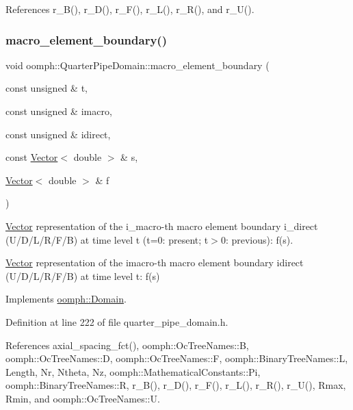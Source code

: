 References r\+\_\+\+B(), r\+\_\+\+D(), r\+\_\+\+F(), r\+\_\+\+L(), r\+\_\+\+R(), and r\+\_\+\+U().

\mbox{\label{classoomph_1_1QuarterPipeDomain_ae8cc6433c58dcfb265335744ed8a330a}} 
\subsubsection{\texorpdfstring{macro\+\_\+element\+\_\+boundary()}{macro\_element\_boundary()}}
{\footnotesize\ttfamily void oomph\+::\+Quarter\+Pipe\+Domain\+::macro\+\_\+element\+\_\+boundary (\begin{DoxyParamCaption}\item[{const unsigned \&}]{t,  }\item[{const unsigned \&}]{imacro,  }\item[{const unsigned \&}]{idirect,  }\item[{const \hyperlink{classoomph_1_1Vector}{Vector}$<$ double $>$ \&}]{s,  }\item[{\hyperlink{classoomph_1_1Vector}{Vector}$<$ double $>$ \&}]{f }\end{DoxyParamCaption})\hspace{0.3cm}{\ttfamily [virtual]}}



\hyperlink{classoomph_1_1Vector}{Vector} representation of the i\+\_\+macro-\/th macro element boundary i\+\_\+direct (U/\+D/\+L/\+R/\+F/B) at time level t (t=0\+: present; t$>$0\+: previous)\+: f(s). 

\hyperlink{classoomph_1_1Vector}{Vector} representation of the imacro-\/th macro element boundary idirect (U/\+D/\+L/\+R/\+F/B) at time level t\+: f(s) 

Implements \hyperlink{classoomph_1_1Domain_a95f3e00d28ea37e6c4d3027bfac91096}{oomph\+::\+Domain}.



Definition at line 222 of file quarter\+\_\+pipe\+\_\+domain.\+h.



References axial\+\_\+spacing\+\_\+fct(), oomph\+::\+Oc\+Tree\+Names\+::B, oomph\+::\+Oc\+Tree\+Names\+::D, oomph\+::\+Oc\+Tree\+Names\+::F, oomph\+::\+Binary\+Tree\+Names\+::L, Length, Nr, Ntheta, Nz, oomph\+::\+Mathematical\+Constants\+::\+Pi, oomph\+::\+Binary\+Tree\+Names\+::R, r\+\_\+\+B(), r\+\_\+\+D(), r\+\_\+\+F(), r\+\_\+\+L(), r\+\_\+\+R(), r\+\_\+\+U(), Rmax, Rmin, and oomph\+::\+Oc\+Tree\+Names\+::U.



